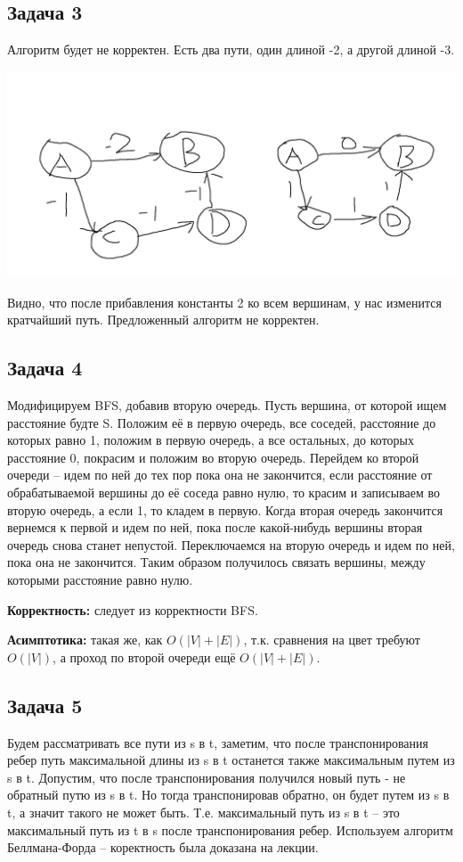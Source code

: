 \documentclass[a4paper,14pt]{article} %
\begin{document}
\subsection{Задача 3}
Алгоритм будет не корректен. Есть два пути, один длиной -2, а другой длиной -3.
\begin{center}
	\includegraphics[scale=0.5]{01.png}
\end{center}
Видно, что после прибавления константы 2 ко всем вершинам, у нас изменится кратчайший путь.
Предложенный алгоритм не корректен.

\subsection{Задача 4}
Модифицируем BFS, добавив вторую очередь. Пусть вершина, от которой ищем расстояние будте S. Положим её в первую очередь, все соседей, расстояние до которых равно 1, положим в первую очередь, а все остальных, до которых расстояние 0, покрасим и положим во вторую очередь.
Перейдем ко второй очереди -- идем по ней до тех пор пока она не закончится, если расстояние от обрабатываемой вершины до её соседа равно нулю, то красим и записываем во вторую очередь, а если 1, то кладем в первую.
Когда вторая очередь закончится вернемся к первой и идем по ней, пока после какой-нибудь вершины вторая очередь снова станет непустой. Переключаемся на вторую очередь и идем по ней, пока она не закончится.
Таким образом получилось связать вершины, между которыми расстояние равно нулю.

\textbf{Корректность: } следует из корректности BFS.

\textbf{Асимптотика: } такая же, как $O(|V| + |E|)$, т.к. сравнения на цвет требуют $O(|V|)$, а проход по второй очереди ещё $O(|V|+|E|)$.

\subsection{Задача 5}
Будем рассматривать все пути из s в t, заметим, что после транспонирования ребер путь максимальной длины из s в t останется также максимальным путем из s в t.
Допустим, что после транспонирования получился новый путь - не обратный путю из s в t. Но тогда транспонировав обратно, он будет путем из s в t, а значит такого не может быть.
Т.е. максимальный путь из s в t -- это максимальный путь из t в s после транспонирования ребер. Используем алгоритм Беллмана-Форда -- коректность была доказана на лекции.
\end{document}
